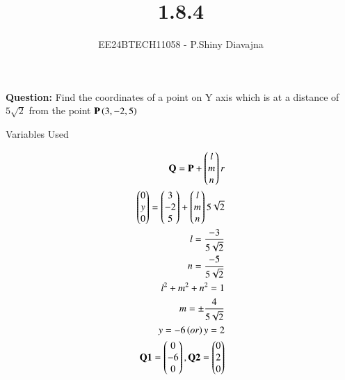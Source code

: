 \documentclass[journal]{IEEEtran}
\begin{document}

\vspace{3cm}

\title{1.8.4}
\author{EE24BTECH11058 - P.Shiny Diavajna}
{\let\newpage\relax\maketitle}

\renewcommand{\thefigure}{\theenumi}
\renewcommand{\thetable}{\theenumi}
\setlength{\intextsep}{10pt} %


\renewcommand{\thetable}{\theenumi}

\textbf{Question:} Find the coordinates of a point on Y axis which is at a distance of $5\sqrt2$ from the point $\mathbf{P}\left(3,-2,5\right)$\\

   \solution
   \begin{table}[h!]    
     \centering
     
     \caption{Variables Used}
     \label{}
   \end{table}

   \begin{align*}
	   \mathbf{Q}=\mathbf{P}+\begin{pmatrix}l\\m\\n\end{pmatrix} r\\
	   \begin{pmatrix}0\\y\\0\end{pmatrix}=\begin{pmatrix}3\\-2\\5\end{pmatrix} + \begin{pmatrix}l\\m\\n\end{pmatrix} 5\sqrt2\\
	   l=\frac{-3}{5\sqrt2}\\
	   n=\frac{-5}{5\sqrt2}\\
           l^{2}+m^{2}+n^{2}=1\\
	   m=\pm \frac{4}{5\sqrt2}\\
	   y=-6 \left(or\right) y=2\\
	   \mathbf{Q1}=\begin{pmatrix}0\\-6\\0\end{pmatrix}  ,  \mathbf{Q2}=\begin{pmatrix}0 \\2\\0\end{pmatrix}\\
   \end{align*}
\end{document}
